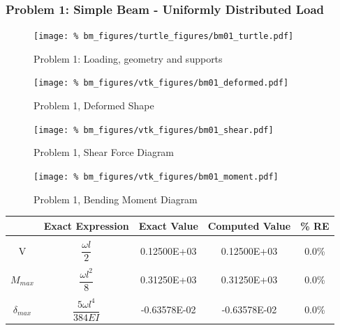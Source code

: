 \subsubsection{Problem 1: Simple Beam - Uniformly Distributed Load}
\begin{figure}[h]
    \texttt{[image: \%
                            bm\_figures/turtle\_figures/bm01\_turtle.pdf]}
    \centering
    \caption{Problem 1: Loading, geometry and supports}
    \label{fig:bm01_turtle}
\end{figure}


\begin{figure}[!htb]
    \texttt{[image: \%
                     bm\_figures/vtk\_figures/bm01\_deformed.pdf]}
    \centering
    \caption{Problem 1, Deformed Shape}
    \label{fig:bm01_deformed}
\end{figure}
\begin{figure}[!htb]
    \texttt{[image: \%
                     bm\_figures/vtk\_figures/bm01\_shear.pdf]}
    \centering
    \caption{Problem 1, Shear Force Diagram}
    \label{fig:bm01_shear}
\end{figure}
\begin{figure}[!htb]
    \texttt{[image: \%
                     bm\_figures/vtk\_figures/bm01\_moment.pdf]}
    \centering
    \caption{Problem 1, Bending Moment Diagram}
    \label{fig:bm01_moment}
\end{figure}
\begin{table}[h!]
\centering
\begin{tabular}{ c| c c c c }
    & Exact Expression & Exact Value & Computed Value & \% RE \\ \hline \\
    V   & $\dfrac{\omega l}{2}$ &  0.12500E+03 & 0.12500E+03 & 0.0\% \\ \\
    $M_{max}$ & $\dfrac{\omega l^2}{8}$ &  0.31250E+03 & 0.31250E+03 & 0.0\% \\ \\
    $\delta_{max}$ & $\dfrac{5 \omega l^4}{384EI}$ & -0.63578E-02 & -0.63578E-02 & 0.0\% \\
\end{tabular}
\end{table}

%
%

\clearpage
